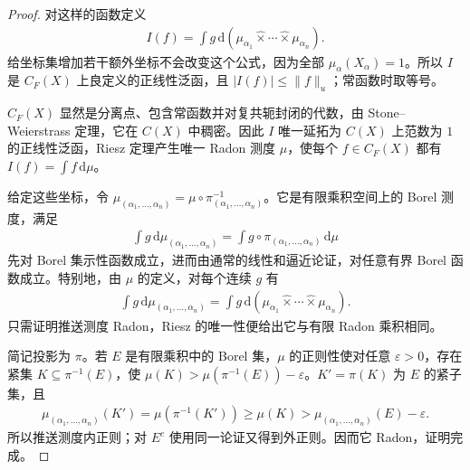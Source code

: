\documentclass[../../main.tex]{subfiles}
\begin{document}
\begin{proof}
对这样的函数定义
\begin{align*}
I(f)=\int g\,\mathrm d(\mu_{\alpha_1}\mathbin{\widehat\times}\cdots\mathbin{\widehat\times}\mu_{\alpha_n}).
\end{align*}
给坐标集增加若干额外坐标不会改变这个公式，因为全部 $\mu_\alpha(X_\alpha)=1$。所以 $I$ 是 $C_F(X)$ 上良定义的正线性泛函，且 $|I(f)|\leqslant\|f\|_u$；常函数时取等号。

$C_F(X)$ 显然是分离点、包含常函数并对复共轭封闭的代数，由 Stone--Weierstrass 定理，它在 $C(X)$ 中稠密。因此 $I$ 唯一延拓为 $C(X)$ 上范数为 $1$ 的正线性泛函，Riesz 定理产生唯一 Radon 测度 $\mu$，使每个 $f\in C_F(X)$ 都有 $I(f)=\int f\,\mathrm d\mu$。

给定这些坐标，令 $\mu_{(\alpha_1,\ldots,\alpha_n)}=\mu\circ\pi_{(\alpha_1,\ldots,\alpha_n)}^{-1}$。它是有限乘积空间上的 Borel 测度，满足
\begin{align*}
\int g\,\mathrm d\mu_{(\alpha_1,\ldots,\alpha_n)}
=\int g\circ\pi_{(\alpha_1,\ldots,\alpha_n)}\,\mathrm d\mu
\end{align*}
先对 Borel 集示性函数成立，进而由通常的线性和逼近论证，对任意有界 Borel 函数成立。特别地，由 $\mu$ 的定义，对每个连续 $g$ 有
\begin{align*}
\int g\,\mathrm d\mu_{(\alpha_1,\ldots,\alpha_n)}
=\int g\,\mathrm d(\mu_{\alpha_1}\mathbin{\widehat\times}\cdots\mathbin{\widehat\times}\mu_{\alpha_n}).
\end{align*}
只需证明推送测度 Radon，Riesz 的唯一性便给出它与有限 Radon 乘积相同。

简记投影为 $\pi$。若 $E$ 是有限乘积中的 Borel 集，$\mu$ 的正则性使对任意 $\varepsilon>0$，存在紧集 $K\subseteq\pi^{-1}(E)$，使 $\mu(K)>\mu(\pi^{-1}(E))-\varepsilon$。$K'=\pi(K)$ 为 $E$ 的紧子集，且
\begin{align*}
\mu_{(\alpha_1,\ldots,\alpha_n)}(K')
=\mu(\pi^{-1}(K'))\geqslant\mu(K)
>\mu_{(\alpha_1,\ldots,\alpha_n)}(E)-\varepsilon.
\end{align*}
所以推送测度内正则；对 $E^c$ 使用同一论证又得到外正则。因而它 Radon，证明完成。
\end{proof}
\end{document}
